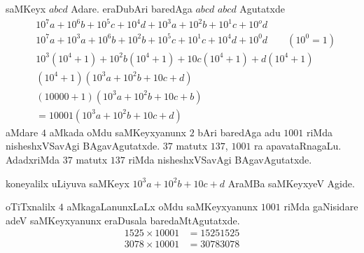 saMKeyx $abcd$ Adare. eraDubAri baredAga $abcd$ $abcd$ Agutatxde
{\fontsize{10}{12}\selectfont
\begin{align*}
& 10^{7}a + 10^{6}b +10^{5}c +10^{4}d + 10^{3}a + 10^{2}b +10^{1}c +10^{o}d\\
& 10^{7}a +10^{3}a +10^{6}b +10^{2}b + 10^{5}c +10^{1}c + 10^{4}d +10^{0}d \qquad\text{$\left(10^0 =1\right)$}\\
& 10^3\left(10^4 +1\right) +10^{2}b\left(10^4 +1\right) + 10c\left(10^4 +1\right) +d \left(10^4+ 1\right)\\
&\left(10^4 +1\right) \left(10^{3}a + 10^{2}b +10c + d\right)\\
&(10000+1)\left(10^{3}a + 10^{2}b+10c+b\right)\\
&=10001\left(10^{3}a + 10^{2}b +10c +d\right)
 \end{align*}}
aMdare $4$ aMkada oMdu saMKeyxyanunx $2$ bAri baredAga adu $1001$ riMda nisheshxVSa\-vAgi BAgavAgutatxde. $37$ matutx $137$, $1001$ ra apavataRnagaLu. AdadxriMda $37$ matutx $137$ riMda nisheshxVSavAgi BAgavAgutatxde.

koneyalilx uLiyuva saMKeyx $10^{3}a+10^{2}b+10c+d$ AraMBa saMKeyxyeV Agide.

oTiTxnalilx $4$ aMkagaLanunxLaLx oMdu saMKeyxyanunx $1001$ riMda gaNisidare adeV saMKeyx\-yanunx eraDusala baredaMtAgutatxde. 
\begin{align*}
1525\times 10001 &= 15251525\\
3078 \times 10001 &= 30783078
\end{align*}
